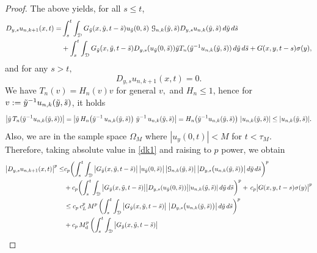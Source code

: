 \documentclass[reqno]{amsart}
\numberwithin{equation}{section}
\newcommand{\cd}{\mathcal{D}}
\newcommand{\cg}{\mathcal{G}}
\begin{document}
\begin{proof}
The above yields, for all $ s\leq t$,
\begin{equation}\label{dk1}
\begin{split}
D_{y,s}u_{n,k+1}(x,t)=&\int_{s}^{t}\int_{\cd}G_{\Tilde{y}}(x,\Tilde{y},t-\Tilde{s})u_{\Tilde{y}}(0,\Tilde{s})
\ \cg_{n,k}(\Tilde{y},\Tilde{s})D_{y,s}u_{n,k}(\Tilde{y},\Tilde{s})\,d\Tilde{y}\,d\Tilde{s}
\\
&+\int_{s}^{t}\int_{\cd}G_{\Tilde{y}}(x,\Tilde{y},t-\Tilde{s})
D_{y,s}(u_{\Tilde{y}}(0,\Tilde{s}))\Tilde{y}T_n(\Tilde{y}^{-1}u_{n,k}(\Tilde{y},\Tilde{s}))\,
d\Tilde{y} \, d\Tilde{s}+G(x,y,t-s)\sigma(y),
\end{split}
\end{equation}
and for any $ s>t, $
$$D_{y,s}u_{n,k+1}(x,t)=0.$$
We have $ T_n(v)=H_n(v)v $ for general
$ v, $ and $ H_n\leq 1$, hence for $v:=\Tilde{y}^{-1}u_{n,k}(\Tilde{y},\Tilde{s})$, it holds
\begin{equation*}
\big|\Tilde{y} \, T_n(\Tilde{y}^{-1}u_{n,k}(\Tilde{y},\Tilde{s}))\big| = \big|\Tilde{y}\, H_n\!\left(\Tilde{y}^{-1}\,u_{n,k}(\Tilde{y},\Tilde{s})\right)\,\Tilde{y}^{-1} \, u_{n,k}(\Tilde{y},\Tilde{s})\big|
= H_n\!\left(\Tilde{y}^{-1}u_{n,k}(\Tilde{y},\Tilde{s})\right)\, |u_{n,k}(\Tilde{y},\Tilde{s})|\\
\leq  |u_{n,k}(\Tilde{y},\Tilde{s})| .
\end{equation*}
Also, we are in the sample space $\Omega_M$ where $|u_y(0,t)|<M$ for $t< \tau_M. $ 
Therefore, taking absolute value in \eqref{dk1} and raising to $p $ power, we obtain
\begin{equation*}
\begin{split}
\big|D_{y,s}u_{n,k+1}(x,t)\big|^p \leq & c_p \biggl(\int_s^t\int_{\cd}\big|G_{\Tilde{y}}(x,\Tilde{y},t-\Tilde{s})\big|\,
\big|u_{\Tilde{y}}(0,\Tilde{s})\big| \,
\big|\cg_{n,k}(\Tilde{y},\Tilde{s})\big|\,
\big|D_{y,s}\bigl(u_{n,k}(\Tilde{y},\Tilde{s})\bigr)\big|\,
d\Tilde{y}\,d\Tilde{s}\biggr)^p
\\
&+ c_p \biggl{(}\int_s^t\int_{\cd}\big{|}G_{\Tilde{y}}(x,\Tilde{y},t-\Tilde{s})\big{|}
\big{|}D_{y,s}(u_{\Tilde{y}}(0,\Tilde{s}))\big{|}|u_{n,k}(\Tilde{y},\Tilde{s})|\,
d\Tilde{y}\,d\Tilde{s}\biggr)^p +\, c_p\big|G(x,y,t-s)\sigma(y)\big|^p\\
&\leq c_p\, c_L^p\, M^p \,\biggl(\int_s^t\int_{\cd}\big|G_{\Tilde{y}}(x,\Tilde{y},t-\Tilde{s})\big|\
\big|D_{y,s}\bigl(u_{n,k}(\Tilde{y},\Tilde{s})\bigr)\big|\,
d\Tilde{y}\,d\Tilde{s}\biggr)^p
\\
&+c_p\, M_{\rm d}^p\,\biggl(\int_s^t\int_{\cd}\big|G_{\Tilde{y}}(x,\Tilde{y},t-\Tilde{s})\big|\,

\end{split}
\end{equation*}
\end{proof}
\end{document}
